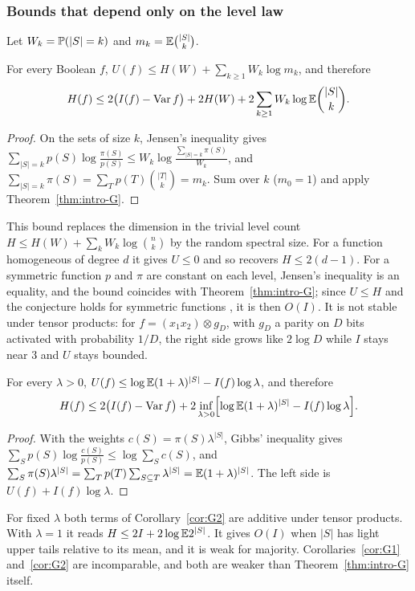 \subsubsection*{Bounds that depend only on the level law}
Let $W_k=\mathbb{P}(|S|=k)$ and $m_k=\mathbb{E}\binom{|S|}{k}$.

\begin{corollary}\label{cor:G1}
For every Boolean $f$, $U(f)\le H(W)+\sum_{k\ge1}W_k\log m_k$, and therefore
\[
H(f)\le2\bigl(I(f)-\operatorname{Var} f\bigr)+2H(W)+2\sum_{k\ge1}W_k\log\mathbb{E}\binom{|S|}{k}.
\]
\end{corollary}

\begin{proof}
On the sets of size $k$, Jensen's inequality gives $\sum_{|S|=k}p(S)\log\frac{\pi(S)}{p(S)}\le W_k\log\frac{\sum_{|S|=k}\pi(S)}{W_k}$, and $\sum_{|S|=k}\pi(S)=\sum_Tp(T)\binom{|T|}{k}=m_k$. Sum over $k$ ($m_0=1$) and apply Theorem~\ref{thm:intro-G}.
\end{proof}

This bound replaces the dimension in the trivial level count $H\le H(W)+\sum_kW_k\log\binom nk$ by the random spectral size. For a function homogeneous of degree $d$ it gives $U\le0$ and so recovers $H\le2(d-1)$. For a symmetric function $p$ and $\pi$ are constant on each level, Jensen's inequality is an equality, and the bound coincides with Theorem~\ref{thm:intro-G}; since $U\le H$ and the conjecture holds for symmetric functions \cite{OWZ2011}, it is then $O(I)$. It is not stable under tensor products: for $f=(x_1x_2)\otimes g_D$, with $g_D$ a parity on $D$ bits activated with probability $1/D$, the right side grows like $2\log D$ while $I$ stays near $3$ and $U$ stays bounded.

\begin{corollary}\label{cor:G2}
For every $\lambda>0$, $U(f)\le\log\mathbb{E}(1+\lambda)^{|S|}-I(f)\log\lambda$, and therefore
\[
H(f)\le2\bigl(I(f)-\operatorname{Var} f\bigr)+2\inf_{\lambda>0}\Bigl[\log\mathbb{E}(1+\lambda)^{|S|}-I(f)\log\lambda\Bigr].
\]
\end{corollary}

\begin{proof}
With the weights $c(S)=\pi(S)\lambda^{|S|}$, Gibbs' inequality gives $\sum_Sp(S)\log\frac{c(S)}{p(S)}\le\log\sum_Sc(S)$, and $\sum_S\pi(S)\lambda^{|S|}=\sum_Tp(T)\sum_{S\subseteq T}\lambda^{|S|}=\mathbb{E}(1+\lambda)^{|S|}$. The left side is $U(f)+I(f)\log\lambda$.
\end{proof}

For fixed $\lambda$ both terms of Corollary~\ref{cor:G2} are additive under tensor products. With $\lambda=1$ it reads $H\le2I+2\log\mathbb{E}2^{|S|}$. It gives $O(I)$ when $|S|$ has light upper tails relative to its mean, and it is weak for majority. Corollaries~\ref{cor:G1} and~\ref{cor:G2} are incomparable, and both are weaker than Theorem~\ref{thm:intro-G} itself.

